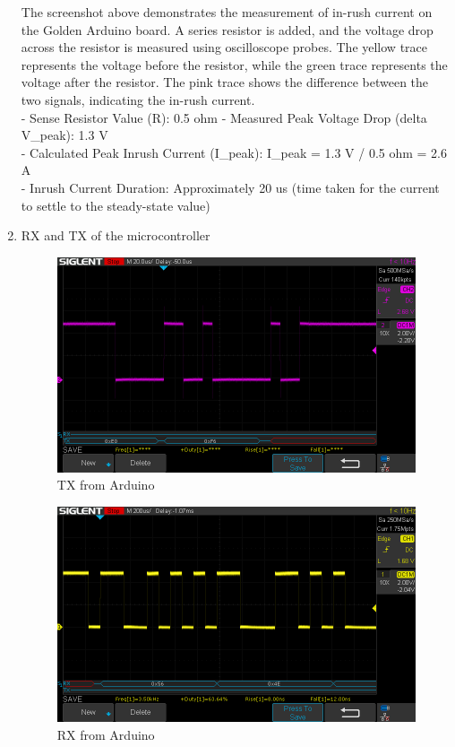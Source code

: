 \documentclass[a4paper,11pt]{article}%
\begin{document}
\begin{enumerate}
		The screenshot above demonstrates the measurement of in-rush current on the Golden Arduino board. A series resistor is added, and the voltage drop across the resistor is measured using oscilloscope probes. The yellow trace represents the voltage before the resistor, while the green trace represents the voltage after the resistor. The pink trace shows the difference between the two signals, indicating the in-rush current.\\
		
		- Sense Resistor Value (R): 0.5 ohm - Measured Peak Voltage Drop (delta V\_peak): 1.3 V \\
		- Calculated Peak Inrush Current (I\_peak): I\_peak = 1.3 V / 0.5 ohm = 2.6 A \\
		- Inrush Current Duration: Approximately 20 us (time taken for the current to settle to the steady-state value)\\
		\item 
		RX and TX of the microcontroller
		\begin{figure}[H]
			\centering
			\includegraphics[scale=0.6]{figures/TX_of_ARDUINO.png}
			\caption{TX from Arduino}
		\end{figure}

		\begin{figure}[H]
			\centering
			\includegraphics[scale=0.6]{figures/RX_of_ARDUINO.png}
			\caption{RX from Arduino}
		\end{figure}
		

\end{enumerate}
\end{document}
